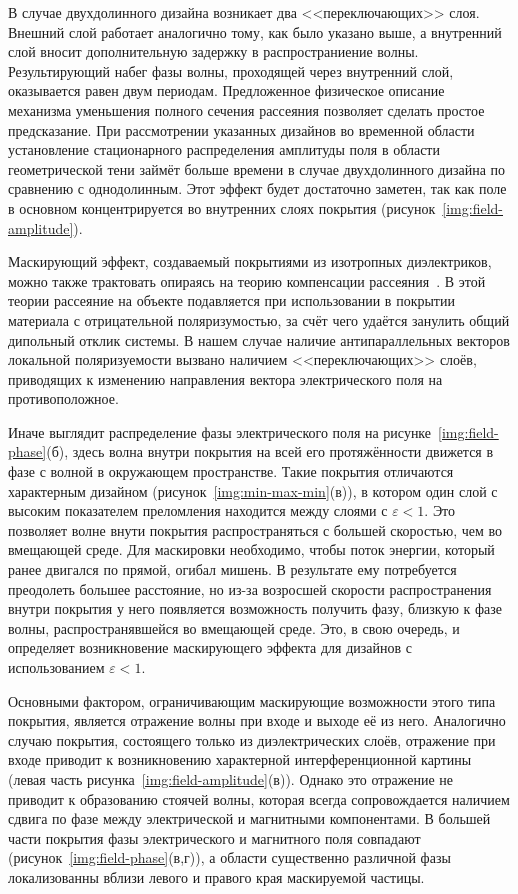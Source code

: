 В случае двухдолинного дизайна возникает два <<переключающих>> слоя.
Внешний слой работает аналогично тому, как было указано выше, а
внутренний слой вносит дополнительную задержку в распространиение
волны. Результирующий набег фазы волны, проходящей через внутренний
слой, оказывается равен двум периодам.  Предложенное физическое
описание механизма уменьшения полного сечения рассеяния позволяет
сделать простое предсказание.  При рассмотрении указанных дизайнов во
временной области установление стационарного распределения амплитуды
поля в области геометрической тени займёт больше времени в случае
двухдолинного дизайна по сравнению с однодолинным. Этот эффект будет
достаточно заметен, так как поле в основном концентрируется во
внутренних слоях покрытия (рисунок~\ref{img:field-amplitude}).

Маскирующий эффект, создаваемый покрытиями из изотропных диэлектриков,
можно также трактовать опираясь на теорию компенсации
рассеяния~\cite{Alu-2005, alu}.  В этой теории рассеяние на объекте
подавляется при использовании в покрытии материала с отрицательной
поляризумостью, за счёт чего удаётся занулить общий дипольный отклик
системы. В нашем случае наличие антипараллельных векторов локальной
поляризуемости вызвано наличием <<переключающих>> слоёв, приводящих к
изменению направления вектора электрического поля на противоположное.

Иначе выглядит распределение фазы электрического поля на
рисунке~\ref{img:field-phase}(б), здесь волна внутри покрытия на всей
его протяжённости движется в фазе с волной в окружающем пространстве.
Такие покрытия отличаются характерным дизайном
(рисунок~\ref{img:min-max-min}(в)), в котором один слой с высоким
показателем преломления находится между слоями с
${\varepsilon<1}$. Это позволяет волне внути покрытия распространяться
с большей скоростью, чем во вмещающей среде. Для маскировки
необходимо, чтобы поток энергии, который ранее двигался по прямой,
огибал мишень. В результате ему потребуется преодолеть большее
расстояние, но из-за возросшей скорости распространения внутри
покрытия у него появляется возможность получить фазу, близкую к фазе
волны, распространявшейся во вмещающей среде. Это, в свою очередь, и
определяет возникновение маскирующего эффекта для дизайнов с
использованием ${\varepsilon<1}$.

Основными фактором, ограничивающим маскирующие возможности этого типа
покрытия, является отражение волны при входе и выходе её из него.
Аналогично случаю покрытия, состоящего только из диэлектрических
слоёв, отражение при входе приводит к возникновению характерной
интерференционной картины (левая часть
рисунка~\ref{img:field-amplitude}(в)). Однако это отражение не
приводит к образованию стоячей волны, которая всегда сопровождается
наличием сдвига по фазе между электрической и магнитными
компонентами. В большей части покрытия фазы электрического и
магнитного поля совпадают (рисунок~\ref{img:field-phase}(в,г)), а
области существенно различной фазы локализованны вблизи левого и
правого края маскируемой частицы.

